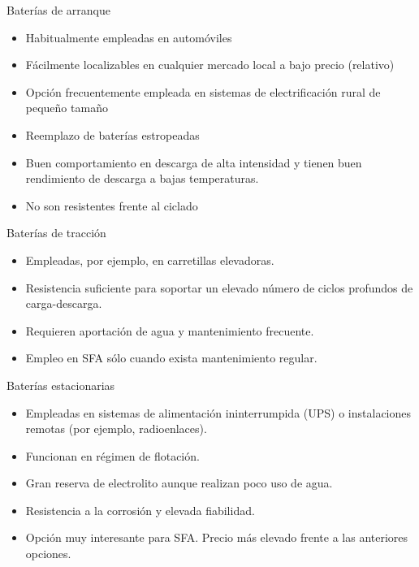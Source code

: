 \documentclass[xcolor={usenames,svgnames,dvipsnames}]{beamer}
\begin{document}
\begin{frame}[label={sec:org969b15f}]{Baterías de arranque}
\begin{itemize}
\item Habitualmente empleadas en automóviles

\item Fácilmente localizables en cualquier mercado local a bajo precio (relativo)

\item Opción frecuentemente empleada en sistemas de electrificación rural de pequeño tamaño

\item Reemplazo de baterías estropeadas

\item Buen comportamiento en descarga de alta intensidad y tienen buen rendimiento de descarga a bajas temperaturas.

\item No son resistentes frente al ciclado
\end{itemize}
\end{frame}

\begin{frame}[label={sec:orge1791cd}]{Baterías de tracción}
\begin{itemize}
\item Empleadas, por ejemplo, en carretillas elevadoras.

\item Resistencia suficiente para soportar un elevado número de ciclos profundos de carga-descarga.

\item Requieren aportación de agua y mantenimiento frecuente.

\item Empleo en SFA sólo cuando exista mantenimiento regular.
\end{itemize}
\end{frame}

\begin{frame}[label={sec:org17d8713}]{Baterías estacionarias}
\begin{itemize}
\item Empleadas en sistemas de alimentación ininterrumpida (UPS) o instalaciones remotas (por ejemplo, radioenlaces).

\item Funcionan en régimen de flotación.

\item Gran reserva de electrolito aunque realizan poco uso de agua.

\item Resistencia a la corrosión y elevada fiabilidad.

\item Opción muy interesante para SFA. Precio más elevado frente a las anteriores opciones.
\end{itemize}
\end{frame}
\end{document}
